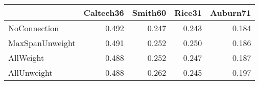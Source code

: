 \begin{tabular}{lrrrr}
\toprule
{} & Caltech36 & Smith60 & Rice31 & Auburn71 \\
\midrule
NoConnection    &     0.492 &   0.247 &  0.243 &    0.184 \\
MaxSpanUnweight &     0.491 &   0.252 &  0.250 &    0.186 \\
AllWeight       &     0.488 &   0.252 &  0.247 &    0.187 \\
AllUnweight     &     0.488 &   0.262 &  0.245 &    0.197 \\
\bottomrule
\end{tabular}
